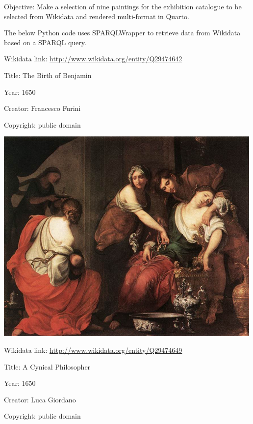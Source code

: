 \documentclass[
  letterpaper,
]{book}
\begin{document}
Objective: Make a selection of nine paintings for the exhibition
catalogue to be selected from Wikidata and rendered multi-format in
Quarto.

The below Python code uses SPARQLWrapper to retrieve data from Wikidata
based on a SPARQL query.

Wikidata link: \url{http://www.wikidata.org/entity/Q29474642}

Title: The Birth of Benjamin

Year: 1650

Creator: Francesco Furini

Copyright: public domain

\includegraphics{./paintings_files/figure-pdf/cell-2-output-2.png}

Wikidata link: \url{http://www.wikidata.org/entity/Q29474649}

Title: A Cynical Philosopher

Year: 1650

Creator: Luca Giordano

Copyright: public domain
\end{document}
